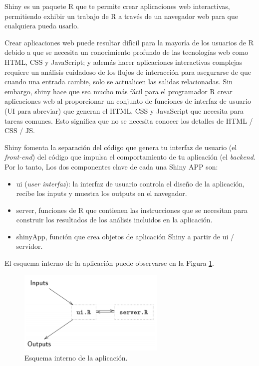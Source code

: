Shiny es un paquete R que te permite crear aplicaciones web interactivas, permitiendo exhibir un trabajo de R a través de un navegador web para que cualquiera pueda usarlo. 

Crear aplicaciones web puede resultar difícil para la mayoría de los usuarios de R debido a que se necesita un conocimiento profundo de las tecnologías web como HTML, CSS y JavaScript; y además hacer aplicaciones interactivas complejas requiere un análisis cuidadoso de los flujos de interacción para asegurarse de que cuando una entrada cambie, solo se actualicen las salidas relacionadas. Sin embargo, shiny hace que sea mucho más fácil para el programador R crear aplicaciones web al proporcionar un conjunto de funciones de interfaz de usuario (UI para abreviar) que generan el HTML, CSS y JavaScript que necesita para tareas comunes. Esto significa que no se necesita conocer los detalles de HTML / CSS / JS.

Shiny fomenta la separación del código que genera tu interfaz de usuario (el \emph{front-end}) del código que impulsa el comportamiento de tu aplicación (el \emph{backend}. Por lo tanto, Los dos componentes clave de cada una Shiny APP son: 

\begin{itemize}
\item ui (\emph{user interfaz}): la interfaz de usuario controla el diseño de la aplicación, recibe los inputs y
muestra los outputs en el navegador.
\item server, funciones de R que contienen las instrucciones que se necesitan para construir los resultados de los análisis incluidos en la aplicación.
\item shinyApp, función que crea objetos de aplicación Shiny a partir de ui / servidor.
\end{itemize}

El esquema interno de la aplicación puede observarse en la Figura \ref{fig:fig321}. 

\begin{figure}[h]
\begin{center}
\includegraphics[width=7cm]{./Graficos/figura7}
\end{center}
\caption{Esquema interno de la aplicación.}
\label{fig:fig321}
\end{figure}


